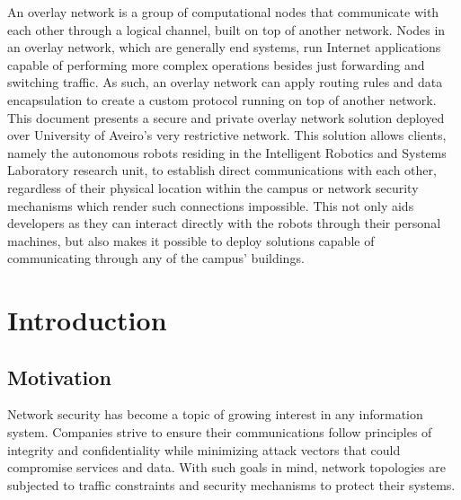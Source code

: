 \documentclass[11pt,twoside,a4paper]{report}
\begin{document}
\TitlePage
  \vspace*{55mm}
       {An overlay network is a group of computational nodes that communicate with each other through a logical channel, built on top of another network. Nodes in an overlay network, which are generally end systems, run Internet applications capable of performing more complex operations besides just forwarding and switching traffic. As such, an overlay network can apply routing rules and data encapsulation to create a custom protocol running on top of another network. This document presents a secure and private overlay network solution deployed over University of Aveiro's very restrictive network. This solution allows clients, namely the autonomous robots residing in the Intelligent Robotics and Systems Laboratory research unit, to establish direct communications with each other, regardless of their physical location within the campus or network security mechanisms which render such connections impossible. This not only aids developers as they can interact directly with the robots through their personal machines, but also makes it possible to deploy solutions capable of communicating through any of the campus' buildings.}
\EndTitlePage
\titlepage\ \endtitlepage %


%
%
\tableofcontents

\cleardoublepage
\listoffigures

\cleardoublepage
\listoftables

\cleardoublepage


\cleardoublepage
{}
\chapter{Introduction}

\section{Motivation}

Network security has become a topic of growing interest in any information system. Companies strive to ensure their communications follow principles of integrity and confidentiality while minimizing attack vectors that could compromise services and data. With such goals in mind, network topologies are subjected to traffic constraints and security mechanisms to protect their systems.
\end{document}
